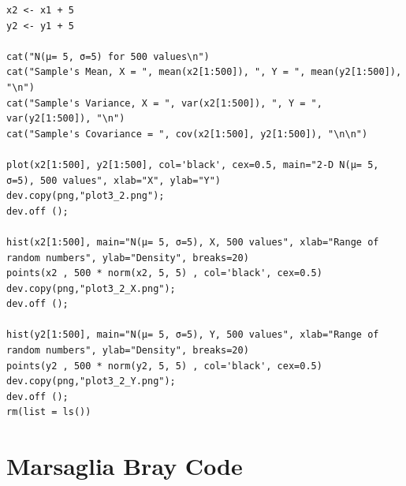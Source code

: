 \documentclass{article}
\begin{document}
\begin{lstlisting}
x2 <- x1 + 5
y2 <- y1 + 5

cat("N(μ= 5, σ=5) for 500 values\n")
cat("Sample's Mean, X = ", mean(x2[1:500]), ", Y = ", mean(y2[1:500]), "\n")
cat("Sample's Variance, X = ", var(x2[1:500]), ", Y = ", var(y2[1:500]), "\n")
cat("Sample's Covariance = ", cov(x2[1:500], y2[1:500]), "\n\n")

plot(x2[1:500], y2[1:500], col='black', cex=0.5, main="2-D N(μ= 5, σ=5), 500 values", xlab="X", ylab="Y")
dev.copy(png,"plot3_2.png");
dev.off ();

hist(x2[1:500], main="N(μ= 5, σ=5), X, 500 values", xlab="Range of random numbers", ylab="Density", breaks=20)
points(x2 , 500 * norm(x2, 5, 5) , col='black', cex=0.5)
dev.copy(png,"plot3_2_X.png");
dev.off ();

hist(y2[1:500], main="N(μ= 5, σ=5), Y, 500 values", xlab="Range of random numbers", ylab="Density", breaks=20)
points(y2 , 500 * norm(y2, 5, 5) , col='black', cex=0.5)
dev.copy(png,"plot3_2_Y.png");
dev.off ();
rm(list = ls())
\end{lstlisting}

\section{Marsaglia Bray Code}

\end{document}
